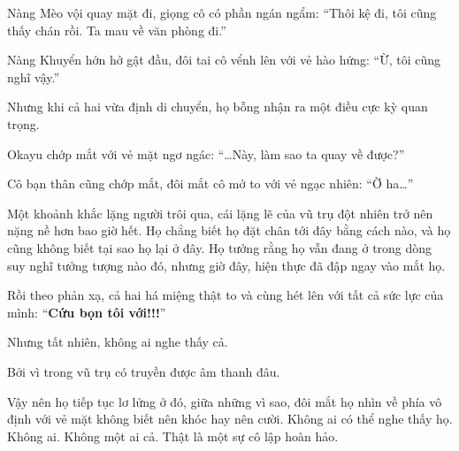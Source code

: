 \documentclass[../main.tex]{subfiles}
\begin{document}
Nàng Mèo vội quay mặt đi, giọng cô có phần ngán ngẩm: ``Thôi kệ đi, tôi cũng thấy chán rồi. Ta mau về văn phòng đi.''

Nàng Khuyển hớn hở gật đầu, đôi tai cô vểnh lên với vẻ hào hứng: ``Ừ, tôi cũng nghĩ vậy.''

Nhưng khi cả hai vừa định di chuyển, họ bỗng nhận ra một điều cực kỳ quan trọng.

Okayu chớp mắt với vẻ mặt ngơ ngác: ``\dots Này, làm sao ta quay về được?''

Cô bạn thân cũng chớp mắt, đôi mắt cô mở to với vẻ ngạc nhiên: ``Ờ ha\dots''

Một khoảnh khắc lặng người trôi qua, cái lặng lẽ của vũ trụ đột nhiên trở nên nặng nề hơn bao giờ hết. Họ chẳng biết họ đặt chân tới đây bằng cách nào, và họ cũng không biết tại sao họ lại ở đây. Họ tưởng rằng họ vẫn đang ở trong dòng suy nghĩ tưởng tượng nào đó, nhưng giờ đây, hiện thực đã đập ngay vào mắt họ.

Rồi theo phản xạ, cả hai há miệng thật to và cùng hét lên với tất cả sức lực của mình: ``\textbf{Cứu bọn tôi với!!!}''

Nhưng tất nhiên, không ai nghe thấy cả.

Bởi vì trong vũ trụ có truyền được âm thanh đâu.

Vậy nên họ tiếp tục lơ lửng ở đó, giữa những vì sao, đôi mắt họ nhìn về phía vô định với vẻ mặt không biết nên khóc hay nên cười. Không ai có thể nghe thấy họ. Không ai. Không một ai cả. Thật là một sự cô lập hoàn hảo.
\end{document}
